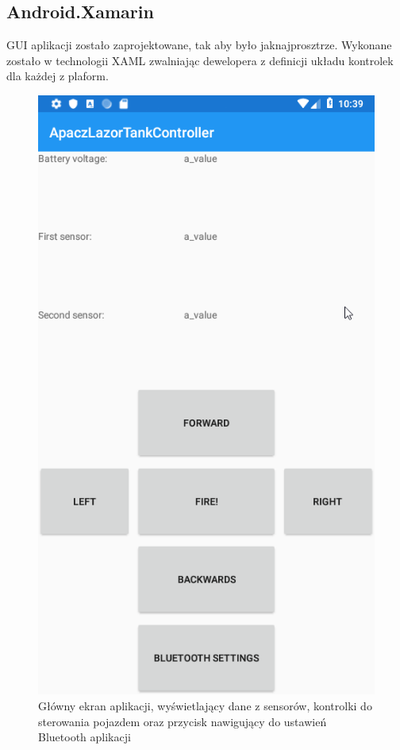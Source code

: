 \documentclass{report}
\begin{document}
	\subsection{Android.Xamarin}
		GUI aplikacji zostało zaprojektowane, tak aby było jaknajprosztrze. Wykonane zostało w technologii XAML zwalniając dewelopera z definicji układu kontrolek dla każdej z plaform.
		\begin{figure}[H]
			\centering            
			\includegraphics[scale=0.6]{android_1.png}
			\caption{Główny ekran aplikacji, wyświetlający dane z sensorów, kontrolki do sterowania pojazdem oraz przycisk nawigujący do ustawień Bluetooth aplikacji}
		\end{figure}
\end{document}
